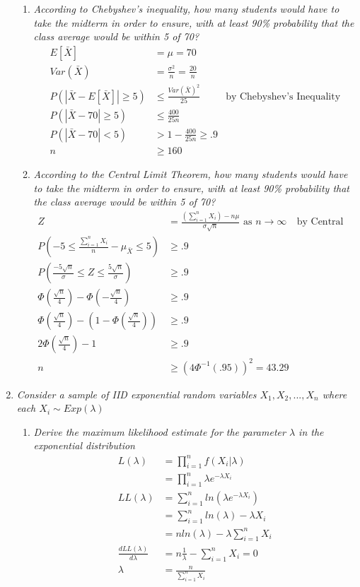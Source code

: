 \documentclass{article} %
\begin{document}
\begin{enumerate}
\begin{enumerate}
	\item \textit{According to Chebyshev's inequality, how many students would have to take the midterm in order to ensure, with at least 90\% probability that the class average would be within 5 of 70?}
	\begin{align*}
	E[\bar{X}] &= \mu = 70\\
	Var(\bar{X}) &= \frac{\sigma^2}{n} = \frac{20}{n}\\
	P(|\bar{X} - E[\bar{X}]| \geq 5) &\leq \frac{Var(\bar{X})^2}{25} &\text{by Chebyshev's Inequality}\\
	P(|\bar{X} - 70| \geq 5) &\leq \frac{400}{25 n}\\
	P(|\bar{X} - 70| < 5) &> 1 - \frac{400}{25 n} \geq .9\\
	n &\geq 160
	\end{align*}
	
	\item \textit{According to the Central Limit Theorem, how many students would have to take the midterm in order to ensure, with at least 90\% probability that the class average would be within 5 of 70?}
	\begin{align*}
	Z &= \frac{(\sum_{i = 1}^{n} X_i) - n\mu}{\sigma \sqrt{n}} \text{ as } n \rightarrow \infty &\text{by Central Limit Theorem}\\
	P(-5 \leq \frac{\sum_{i = 1}^{n} X_i}{n} - \mu_{\bar{X}} \leq 5) &\geq .9\\
	P(\frac{-5 \sqrt{n}}{\sigma} \leq Z \leq \frac{5 \sqrt{n}}{\sigma}) &\geq .9\\
	\Phi(\frac{\sqrt{n}}{4}) - \Phi(-\frac{\sqrt{n}}{4}) &\geq .9\\
	\Phi(\frac{\sqrt{n}}{4}) - (1 - \Phi(\frac{\sqrt{n}}{4})) &\geq .9\\
	2\Phi(\frac{\sqrt{n}}{4}) - 1 &\geq .9\\
	n &\geq (4\Phi^{-1}(.95))^2 = 43.29
	\end{align*}
	
	\end{enumerate}
	
	\item \textit{Consider a sample of IID exponential random variables $X_1, X_2, ..., X_n$ where each $X_i \sim Exp(\lambda)$}
	\begin{enumerate}
	\item \textit{Derive the maximum likelihood estimate for the parameter $\lambda$ in the exponential distribution}
	\begin{align*}
	L(\lambda) &= \prod_{i = 1}^{n} f(X_i | \lambda)\\
	&= \prod_{i = 1}^{n} \lambda e^{-\lambda X_i}\\
	LL(\lambda) &= \sum_{i = 1}^{n} ln(\lambda e^{-\lambda X_i})\\
	&= \sum_{i = 1}^{n} ln(\lambda) - \lambda X_i\\
	&= n ln(\lambda) - \lambda \sum_{i = 1}^{n} X_i\\
	\frac{dLL(\lambda)}{d\lambda} &= n \frac{1}{\lambda} - \sum_{i = 1}^{n} X_i = 0\\
	\lambda &= \frac{n}{\sum_{i = 1}^{n} X_i}
	\end{align*}
	

\end{enumerate}
\end{enumerate}
\end{document}
